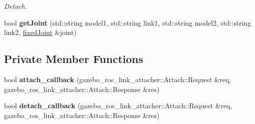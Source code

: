 \begin{DoxyCompactItemize}
\begin{DoxyCompactList}\small\item\em Detach. \end{DoxyCompactList}\item 
bool {\bfseries get\+Joint} (std\+::string model1, std\+::string link1, std\+::string model2, std\+::string link2, \hyperlink{structgazebo_1_1GazeboRosLinkAttacher_1_1fixedJoint}{fixed\+Joint} \&joint)\hypertarget{classgazebo_1_1GazeboRosLinkAttacher_ac894e753858bc9037956bc164970dea1}{}\label{classgazebo_1_1GazeboRosLinkAttacher_ac894e753858bc9037956bc164970dea1}

\end{DoxyCompactItemize}
\subsection*{Private Member Functions}
\begin{DoxyCompactItemize}
\item 
bool {\bfseries attach\+\_\+callback} (gazebo\+\_\+ros\+\_\+link\+\_\+attacher\+::\+Attach\+::\+Request \&req, gazebo\+\_\+ros\+\_\+link\+\_\+attacher\+::\+Attach\+::\+Response \&res)\hypertarget{classgazebo_1_1GazeboRosLinkAttacher_a77b58d1c8f8f9887c4eacdbae33dbbc2}{}\label{classgazebo_1_1GazeboRosLinkAttacher_a77b58d1c8f8f9887c4eacdbae33dbbc2}

\item 
bool {\bfseries detach\+\_\+callback} (gazebo\+\_\+ros\+\_\+link\+\_\+attacher\+::\+Attach\+::\+Request \&req, gazebo\+\_\+ros\+\_\+link\+\_\+attacher\+::\+Attach\+::\+Response \&res)\hypertarget{classgazebo_1_1GazeboRosLinkAttacher_a63e93b7efb7c97e80bab07ea0a0a0fb6}{}\label{classgazebo_1_1GazeboRosLinkAttacher_a63e93b7efb7c97e80bab07ea0a0a0fb6}

\end{DoxyCompactItemize}
